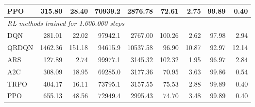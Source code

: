 \begin{samepage}
\begin{center}
\begin{tabular}{l|rr|rr|rr|rr}
    PPO          &   315.80 &    28.40 &    70939.2 &    2876.78 &   72.61 &    2.75 &   99.89 &    0.40 \\
    \midrule
    \multicolumn{9}{l}{\textit{RL methods trained for 1.000.000 steps}} \\
    \midrule
    DQN          &   281.01 &    22.02 &    97942.1 &    2767.00 &  100.26 &    2.62 &   97.98 &    2.94 \\
    QRDQN        &  1462.36 &   151.18 &    94615.9 &   10537.58 &   96.90 &   10.87 &   92.97 &   12.14 \\
    ARS          &   127.89 &     2.74 &    99977.1 &    3145.32 &  102.32 &    1.95 &   96.97 &    2.84 \\
    A2C          &   308.09 &    18.95 &    69285.0 &    3177.36 &   70.95 &    3.63 &   99.86 &    0.54 \\
    TRPO         &   404.17 &    16.11 &    73795.1 &    3157.55 &   75.53 &    2.88 &   99.89 &    0.40 \\
    PPO          &   655.13 &    48.56 &    72949.4 &    2995.43 &   74.70 &    3.48 &   99.89 &    0.40 \\
    \bottomrule
  \end{tabular}
\end{center}
\end{samepage}

